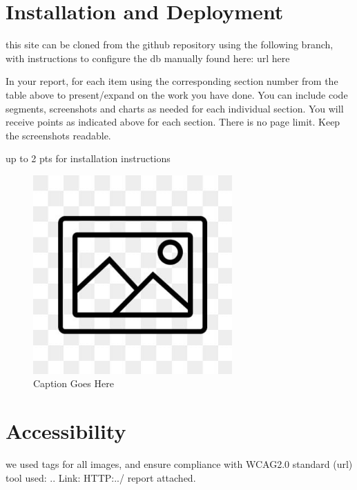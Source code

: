 \documentclass[12pt, letterpaper]{article}
\begin{document}
 \newpage

\section{Installation and Deployment}
this site can be cloned from the github repository using the following branch, with instructions to configure the db manually found here: url here

In your report, for each item using the corresponding section number from the table above to present/expand on the work you have done. You can include code segments, screenshots and charts as needed for each individual section. You will receive points as indicated above for each section. There is no page limit. Keep the screenshots readable.

up to 2 pts for installation instructions

\begin{figure}[htbp]
	\centering
	\includegraphics[width=3in]{images/placeholder.jpg}
	\caption{Caption Goes Here}
 \end{figure}

 \newpage

\section{Accessibility}
we used tags for all images, and ensure compliance with WCAG2.0 standard (url)  tool used: .. Link: HTTP:../ report attached.
\end{document}
